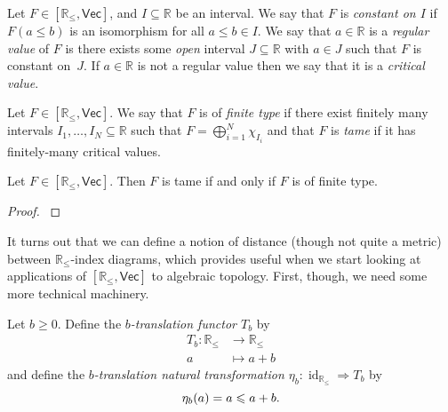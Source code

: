 \documentclass[12pt]{article}
\numberwithin{equation}{subsection}
\numberwithin{theorem}{subsection}
\numberwithin{lemma}{subsection}
\numberwithin{corollary}{subsection}
\numberwithin{definition}{subsection}
\numberwithin{example}{subsection}
\numberwithin{note}{subsection}
\newcommand{\rr}{\mathbb{R}}
\newcommand{\rrleq}{\rr_\leqslant}
\newcommand{\Vecrrdiag}{[\rr_\leqslant,\mathsf{Vec}]}
\DeclareMathOperator{\id}{id}
\newcommand{\nt}{\Rightarrow}
\begin{document}
        \begin{definition}
            Let $F\in\Vecrrdiag$, and $I\subseteq\rr$ be an interval.
            We say that $F$ is \emph{constant on $I$} if $F(a\leqslant b)$ is an isomorphism for all $a\leqslant b\in I$.
            We say that $a\in\rr$ is a \emph{regular value} of $F$ is there exists some \emph{open} interval $J\subseteq\rr$ with $a\in J$ such that $F$ is constant \mbox{on $J$}.
            If $a\in\rr$ is not a regular value then we say that it is a \emph{critical value}.
        \end{definition}



        \begin{definition}
            Let $F\in\Vecrrdiag$.
            We say that $F$ is of \emph{finite type} if there exist finitely many intervals $I_1,\ldots,I_N\subseteq\rr$ such that $F=\bigoplus_{i=1}^N\chi_{I_i}$ and that $F$ is \emph{tame} if it has finitely-many critical values.
        \end{definition}

        \begin{lemma}\label{le:tame-iff-finite-type}
            Let $F\in\Vecrrdiag$.
            Then $F$ is tame if and only if $F$ is of finite type.
        \end{lemma}

        \begin{proof}
            \cite[Theorem~4.6]{Bubenik:dn}
        \end{proof}

        It turns out that we can define a notion of distance (though not quite a metric) between $\rrleq$-index diagrams, which provides useful when we start looking at applications of $\Vecrrdiag$ to algebraic topology.
        First, though, we need some more technical machinery.

        \begin{definition}
            Let $b\geqslant0$.
            Define the \emph{$b$-translation functor $T_b$} by
            \begin{align*}
                T_b\colon\rrleq&\to\rrleq\\
                a&\mapsto a+b
            \end{align*}
            and define the \emph{$b$-translation natural transformation $\eta_b\colon\id_{\rrleq}\nt T_b$} by
            \begin{equation*}
                \eta_b(a) = a\leqslant a+b.\qedhere
            \end{equation*}
        \end{definition}
\end{document}
